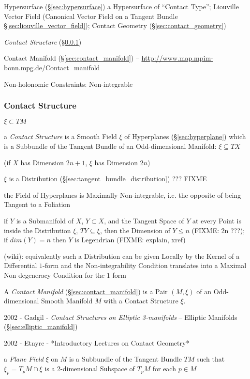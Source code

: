 Hypersurface (\S\ref{sec:hypersurface}) a Hypersurface of ``Contact Type'';
Liouville Vector Field (Canonical Vector Field on a Tangent Bundle
\S\ref{sec:liouville_vector_field}); \fist Contact Geometry
(\S\ref{sec:contact_geometry})

\emph{Contact Structure} (\S\ref{sec:contact_structure})

\fist Contact Manifold (\S\ref{sec:contact_manifold}) --
\url{http://www.map.mpim-bonn.mpg.de/Contact_manifold}

Non-holonomic Constraints: Non-integrable



\subsubsection{Contact Structure}\label{sec:contact_structure}

$\xi \subset TM$

a \emph{Contact Structure} is a Smooth Field $\xi$ of Hyperplanes
(\S\ref{sec:hyperplane}) which is a Subbundle of the Tangent Bundle of an
Odd-dimensional Manifold: $\xi \subseteq T X$

(if $X$ has Dimension $2n+1$, $\xi$ has Dimension $2n$) %

$\xi$ is a Distribution (\S\ref{sec:tangent_bundle_distribution}) ??? FIXME

the Field of Hyperplanes is Maximally Non-integrable, i.e. the opposite of
being Tangent to a Foliation

if $Y$ is a Submanifold of $X$, $Y \subset X$, and the Tangent Space of $Y$ at
every Point is inside the Distribution $\xi$, $T Y \subseteq \xi$, then the
Dimension of $Y \leq n$ (FIXME: 2n ???); if $dim(Y) = n$ then $Y$ is Legendrian
(FIXME: explain, xref)

(wiki): equivalently such a Distribution can be given Locally by the Kernel of
a Differential $1$-form and the Non-integrability Condition translates into a
Maximal Non-degeneracy Condition for the $1$-form

A \emph{Contact Manifold} (\S\ref{sec:contact_manifold}) is a Pair $(M,\xi)$ of
an Odd-dimensional Smooth Manifold $M$ with a Contact Structure $\xi$.

2002 - Gadgil - \emph{Contact Structures on Elliptic 3-manifolds}
-- Elliptic Manifolds (\S\ref{sec:elliptic_manifold})

2002 - Etnyre - *Introductory Lectures on Contact Geometry*

a \emph{Plane Field} $\xi$ on $M$ is a Subbundle of the Tangent Bundle $TM$
such that $\xi_p = T_p M \cap \xi$ is a 2-dimensional Subspace of $T_pM$ for
each $p \in M$



